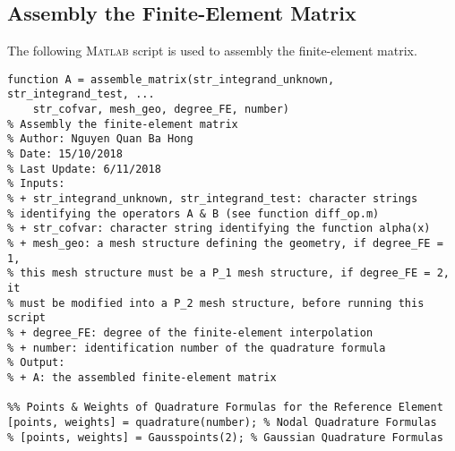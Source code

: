 \documentclass[11pt,a4paper,center,notitlepage]{article}
\numberwithin{equation}{section}
\begin{document}
\subsection{Assembly the Finite-Element Matrix}\label{sec8.5}
The following \textsc{Matlab} script is used to assembly the finite-element matrix.
\begin{verbatim}
function A = assemble_matrix(str_integrand_unknown, str_integrand_test, ...
    str_cofvar, mesh_geo, degree_FE, number)
% Assembly the finite-element matrix
% Author: Nguyen Quan Ba Hong
% Date: 15/10/2018
% Last Update: 6/11/2018
% Inputs:
% + str_integrand_unknown, str_integrand_test: character strings
% identifying the operators A & B (see function diff_op.m)
% + str_cofvar: character string identifying the function alpha(x)
% + mesh_geo: a mesh structure defining the geometry, if degree_FE = 1,
% this mesh structure must be a P_1 mesh structure, if degree_FE = 2, it
% must be modified into a P_2 mesh structure, before running this script
% + degree_FE: degree of the finite-element interpolation
% + number: identification number of the quadrature formula
% Output:
% + A: the assembled finite-element matrix

%% Points & Weights of Quadrature Formulas for the Reference Element
[points, weights] = quadrature(number); % Nodal Quadrature Formulas
% [points, weights] = Gausspoints(2); % Gaussian Quadrature Formulas


\end{verbatim}
\end{document}
